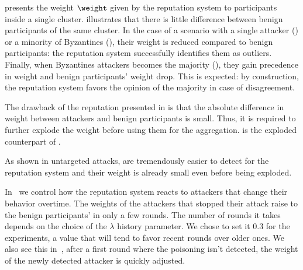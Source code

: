  presents the weight $\weight$ given by the reputation system to participants inside a single cluster. 
 illustrates that there is little difference between benign participants of the same cluster.
In the case of a scenario with a single attacker () or a minority of Byzantines (), their weight is reduced compared to benign participants: the reputation system successfully identifies them as outliers. %
Finally, when Byzantines attackers becomes the majority (), they gain precedence in weight and benign participants' weight drop. 
This is expected: by construction, the reputation system favors the opinion of the majority in case of disagreement.  

The drawback of the reputation presented in  is that the absolute difference in weight between attackers and benign participants is small.  
Thus, it is required to further explode the weight before using them for the aggregation.
 is the exploded counterpart of .  

As shown in  untargeted attacks, are tremendously easier to detect for the reputation system and their weight is already small even before being exploded. 

In~ we control how the reputation system reacts to attackers that change their behavior overtime. 
The weights of the attackers that stopped their attack raise to the benign participants' in only a few rounds. 
The number of rounds it takes depends on the choice of the $\lambda$ history parameter. 
We chose to set it 0.3 for the experiments, a value that will tend to favor recent rounds over older ones.  
We also see this in~, after a first round where the poisoning isn't detected, the weight of the newly detected attacker is quickly adjusted. 

